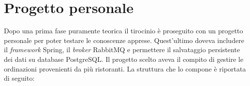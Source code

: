 \chapter{Progetto personale}

Dopo una prima fase puramente teorica il tirocinio è proseguito con un progetto personale per poter testare le conoscenze apprese. Quest'ultimo doveva includere il \textit{framework} Spring, il \textit{broker} RabbitMQ e permettere il salvataggio persistente dei dati su database PostgreSQL. Il progetto \cite{projtutorial} scelto aveva il compito di gestire le ordinazioni provenienti da più ristoranti. La struttura che lo compone è riportata di seguito:
\begin{flushleft}
\end{flushleft}

